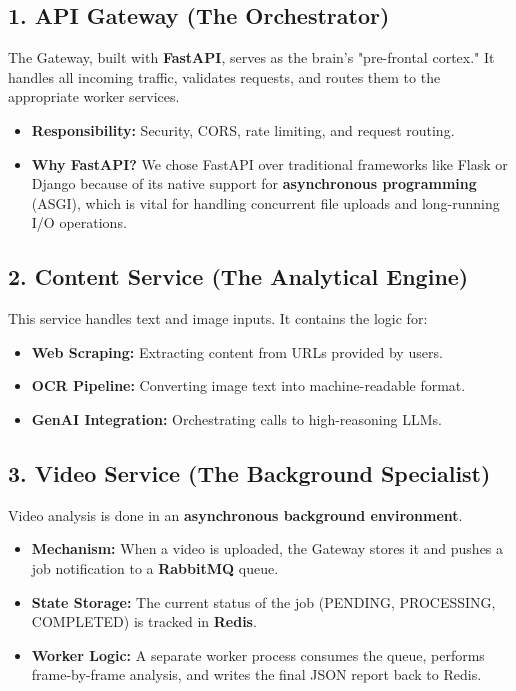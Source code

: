 \documentclass[12pt]{article}
\begin{document}
\subsection{1. API Gateway (The Orchestrator)}
The Gateway, built with \textbf{FastAPI}, serves as the brain's "pre-frontal cortex." It handles all incoming traffic, validates requests, and routes them to the appropriate worker services.
\begin{itemize}
    \item \textbf{Responsibility:} Security, CORS, rate limiting, and request routing.
    \item \textbf{Why FastAPI?} We chose FastAPI over traditional frameworks like Flask or Django because of its native support for \textbf{asynchronous programming} (ASGI), which is vital for handling concurrent file uploads and long-running I/O operations.
\end{itemize}

\subsection{2. Content Service (The Analytical Engine)}
This service handles text and image inputs. It contains the logic for:
\begin{itemize}
    \item \textbf{Web Scraping:} Extracting content from URLs provided by users.
    \item \textbf{OCR Pipeline:} Converting image text into machine-readable format.
    \item \textbf{GenAI Integration:} Orchestrating calls to high-reasoning LLMs.
\end{itemize}

\subsection{3. Video Service (The Background Specialist)}
Video analysis is done in an \textbf{asynchronous background environment}. 
\begin{itemize}
    \item \textbf{Mechanism:} When a video is uploaded, the Gateway stores it and pushes a job notification to a \textbf{RabbitMQ} queue.
    \item \textbf{State Storage:} The current status of the job (PENDING, PROCESSING, COMPLETED) is tracked in \textbf{Redis}.
    \item \textbf{Worker Logic:} A separate worker process consumes the queue, performs frame-by-frame analysis, and writes the final JSON report back to Redis.
\end{itemize}
\end{document}
